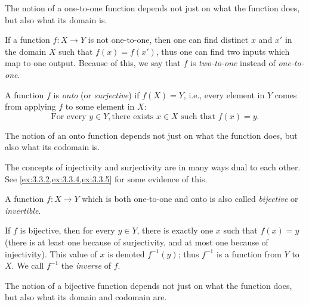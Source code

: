 \begin{note}
  The notion of a one-to-one function depends not just on what the function does, but also what its domain is.
\end{note}

\setcounter{thm}{15}
\begin{rmk}\label{3.3.16}
  If a function \(f : X \to Y\) is not one-to-one, then one can find distinct \(x\) and \(x'\) in the domain \(X\) such that \(f(x) = f(x')\), thus one can find two inputs which map to one output.
  Because of this, we say that \(f\) is \emph{two-to-one} instead of \emph{one-to-one}.
\end{rmk}

\begin{defn}\label{3.3.17}
  A function \(f\) is \emph{onto} (or \emph{surjective}) if \(f(X) = Y\), i.e., every element in \(Y\) comes from applying \(f\) to some element in \(X\):
  \[
    \text{For every } y \in Y, \text{there exists } x \in X \text{ such that } f(x) = y.
  \]
\end{defn}

\begin{note}
  The notion of an onto function depends not just on what the function does, but also what its codomain is.
\end{note}

\setcounter{thm}{18}
\begin{rmk}\label{3.3.19}
  The concepts of injectivity and surjectivity are in many ways dual to each other.
  See \cref{ex:3.3.2,ex:3.3.4,ex:3.3.5} for some evidence of this.
\end{rmk}

\begin{defn}\label{3.3.20}
  A function \(f : X \to Y\) which is both one-to-one and onto is also called \emph{bijective} or \emph{invertible}.

  If \(f\) is bijective, then for every \(y \in Y\), there is exactly one \(x\) such that \(f(x) = y\) (there is at least one because of surjectivity, and at most one because of injectivity).
  This value of \(x\) is denoted \(f^{-1}(y)\); thus \(f^{-1}\) is a function from \(Y\) to \(X\).
  We call \(f^{-1}\) the \emph{inverse} of \(f\).
\end{defn}

\begin{note}
  The notion of a bijective function depends not just on what the function does, but also what its domain and codomain are.
\end{note}

